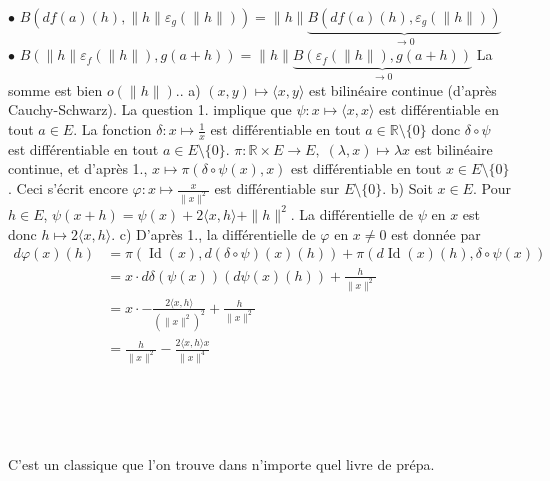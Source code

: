 \documentclass{report}
\DeclareMathOperator{\Id}{Id}
\begin{document}
$\bullet$ $B(df(a)(h),\|h\|\varepsilon_g(\|h\|)) =\|h\| \underbrace{B(df(a)(h),\varepsilon_g(\|h\|))}_{\to 0} $\newline\newline
$\bullet$ $B(\|h\|\varepsilon_f(\|h\|),g(a+h)) =\|h\| \underbrace{B(\varepsilon_f(\|h\|),g(a+h))}_{\to 0}$\newline \newline
La somme est bien $o(\|h\|)$.\newline {}. a) $(x,y)\mapsto\langle x,y \rangle$ est bilinéaire continue (d'après Cauchy-Schwarz). La question 1. implique que $\psi:x\mapsto \langle x,x \rangle$ est différentiable en tout $a\in  E$. La fonction $\delta: x\mapsto \frac 1x$ est différentiable en tout $a\in \mathbb R\setminus \{0\}$ donc $\delta\circ \psi$ est différentiable en tout $a\in E\setminus \{0\}$.\newline
$\pi: \mathbb R\times E \to  E,\; (\lambda,x)\mapsto \lambda x$ est bilinéaire continue, et d'après 1., $x\mapsto \pi(\delta\circ \psi(x),x)$ est différentiable en tout $x\in E\setminus \{0\}$.\newline
Ceci s'écrit encore $\varphi:x\mapsto \frac{x}{\|x\|^2}$ est différentiable sur $E\setminus \{0\}$. \newline 
\newline
b) Soit $x\in E$. Pour $h\in E$, $\psi(x+h)= \psi(x) + 2\langle x,h \rangle + \|h\|^2$. \newline
La différentielle de $\psi$ en $x$ est donc $h\mapsto 2\langle x,h \rangle$.\newline
\newline
c) D'après 1., la différentielle de $\varphi$ en $x\neq 0$ est donnée par $$ \begin{aligned} d\varphi(x)(h)&= \pi(\Id(x),d(\delta\circ \psi)(x)(h)) +\pi(d\Id(x)(h),\delta\circ \psi(x))\\
&= x\cdot d\delta(\psi(x))(d\psi(x)(h)) + \frac{h}{\|x\|^2}\\
&= x\cdot -\frac{2\langle x,h\rangle}{(\|x\|^2)^2} + \frac{h}{\|x\|^2}\\
&= \frac{h}{\|x\|^2} - \frac{2\langle x,h\rangle x}{\|x\|^4} \end{aligned}$$

\subsection{} \noindent{}\\ 
\\ 
\\
\noindent C'est un classique que l'on trouve dans n'importe quel livre de prépa.
\end{document}
